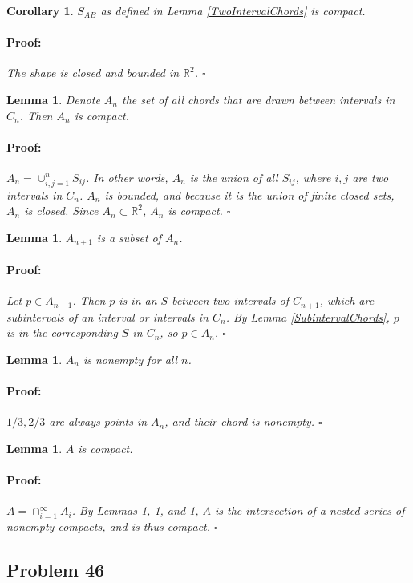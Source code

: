\documentclass{article}
\newenvironment{proof}{\paragraph{Proof:}}{\hfill$\square$}
\newtheorem{lemma}[theorem]{Lemma}
\newtheorem{corollary}[theorem]{Corollary}
\begin{document}
\begin{corollary}
\label{TwoIntervalCompact}
$S_{AB}$ as defined in Lemma \ref{TwoIntervalChords} is compact.
\begin{proof}
The shape is closed and bounded in $\mathbb{R}^2$.
\end{proof}
\end{corollary}

\begin{lemma}
\label{ChordAIsCompact}
Denote $A_n$ the set of all chords that are drawn between intervals in $C_n$. Then $A_n$ is compact.
\begin{proof}
$A_n = \cup_{i, j=1}^n S_{ij}$. In other words, $A_n$ is the union of all $S_{ij}$, where $i, j$ are two intervals in $C_n$. $A_n$ is bounded, and because it is the union of finite closed sets, $A_n$ is closed. Since $A_n \subset \mathbb{R}^2$, $A_n$ is compact.
\end{proof}
\end{lemma}

\begin{lemma}
\label{ChordAIsNested}
$A_{n+1}$ is a subset of $A_n$.
\begin{proof}
Let $p \in A_{n+1}$. Then $p$ is in an $S$ between two intervals of $C_{n+1}$, which are subintervals of an interval or intervals in $C_n$. By Lemma \ref{SubintervalChords}, $p$ is in the corresponding $S$ in $C_n$, so $p \in A_n$.
\end{proof}
\end{lemma}

\begin{lemma}
\label{ChordAIsNonempty}
$A_n$ is nonempty for all $n$.
\begin{proof}
${1/3, 2/3}$ are always points in $A_n$, and their chord is nonempty.
\end{proof}
\end{lemma}

\begin{lemma}
$A$ is compact.
\begin{proof}
$A = \cap_{i=1}^\infty A_i$. By Lemmas \ref{ChordAIsCompact}, \ref{ChordAIsNested}, and \ref{ChordAIsNonempty}, $A$ is the intersection of a nested series of nonempty compacts, and is thus compact. 
\end{proof}
\end{lemma}

\subsection*{Problem 46}
\end{document}
